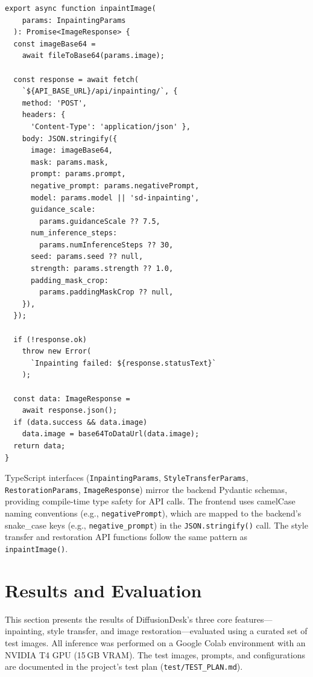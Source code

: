 \documentclass[12pt,a4paper]{report}
\begin{document}
\begin{lstlisting}[language={[LaTeX]TeX}, caption={Inpainting API client function (\texttt{imageApi.ts})}, label={lst:inpaint_api}, morekeywords={export,async,function,const,await,if,return,throw,new}]
export async function inpaintImage(
    params: InpaintingParams
  ): Promise<ImageResponse> {
  const imageBase64 =
    await fileToBase64(params.image);

  const response = await fetch(
    `${API_BASE_URL}/api/inpainting/`, {
    method: 'POST',
    headers: {
      'Content-Type': 'application/json' },
    body: JSON.stringify({
      image: imageBase64,
      mask: params.mask,
      prompt: params.prompt,
      negative_prompt: params.negativePrompt,
      model: params.model || 'sd-inpainting',
      guidance_scale:
        params.guidanceScale ?? 7.5,
      num_inference_steps:
        params.numInferenceSteps ?? 30,
      seed: params.seed ?? null,
      strength: params.strength ?? 1.0,
      padding_mask_crop:
        params.paddingMaskCrop ?? null,
    }),
  });

  if (!response.ok)
    throw new Error(
      `Inpainting failed: ${response.statusText}`
    );

  const data: ImageResponse =
    await response.json();
  if (data.success && data.image)
    data.image = base64ToDataUrl(data.image);
  return data;
}
\end{lstlisting}

TypeScript interfaces (\texttt{InpaintingParams}, \texttt{StyleTransferParams}, \texttt{RestorationParams}, \texttt{ImageResponse}) mirror the backend Pydantic schemas, providing compile-time type safety for API calls. The frontend uses camelCase naming conventions (e.g., \texttt{negativePrompt}), which are mapped to the backend's snake\_case keys (e.g., \texttt{negative\_prompt}) in the \texttt{JSON.stringify()} call. The style transfer and restoration API functions follow the same pattern as \texttt{inpaintImage()}.

\newpage

\section{Results and Evaluation}

This section presents the results of DiffusionDesk's three core features---inpainting, style transfer, and image restoration---evaluated using a curated set of test images. All inference was performed on a Google Colab environment with an NVIDIA T4 GPU (15\,GB VRAM). The test images, prompts, and configurations are documented in the project's test plan (\texttt{test/TEST\_PLAN.md}).
\end{document}
